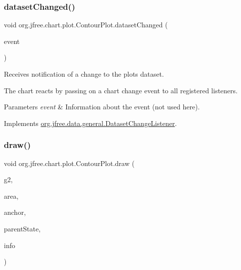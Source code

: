 \subsubsection{\texorpdfstring{dataset\+Changed()}{datasetChanged()}}
{\footnotesize\ttfamily void org.\+jfree.\+chart.\+plot.\+Contour\+Plot.\+dataset\+Changed (\begin{DoxyParamCaption}\item[{\mbox{\hyperlink{classorg_1_1jfree_1_1data_1_1general_1_1_dataset_change_event}{Dataset\+Change\+Event}}}]{event }\end{DoxyParamCaption})}

Receives notification of a change to the plot\textquotesingle{}s dataset. 

The chart reacts by passing on a chart change event to all registered listeners.


\begin{DoxyParams}{Parameters}
{\em event} & Information about the event (not used here). \\
\hline
\end{DoxyParams}


Implements \mbox{\hyperlink{interfaceorg_1_1jfree_1_1data_1_1general_1_1_dataset_change_listener_a26ca53969f0dfa539f52e846a3cd72fe}{org.\+jfree.\+data.\+general.\+Dataset\+Change\+Listener}}.

\mbox{\label{classorg_1_1jfree_1_1chart_1_1plot_1_1_contour_plot_a7dbda9fb682f0521cbbe6c3f32b74099}} 
\subsubsection{\texorpdfstring{draw()}{draw()}}
{\footnotesize\ttfamily void org.\+jfree.\+chart.\+plot.\+Contour\+Plot.\+draw (\begin{DoxyParamCaption}\item[{Graphics2D}]{g2,  }\item[{Rectangle2D}]{area,  }\item[{Point2D}]{anchor,  }\item[{\mbox{\hyperlink{classorg_1_1jfree_1_1chart_1_1plot_1_1_plot_state}{Plot\+State}}}]{parent\+State,  }\item[{\mbox{\hyperlink{classorg_1_1jfree_1_1chart_1_1plot_1_1_plot_rendering_info}{Plot\+Rendering\+Info}}}]{info }\end{DoxyParamCaption})}

